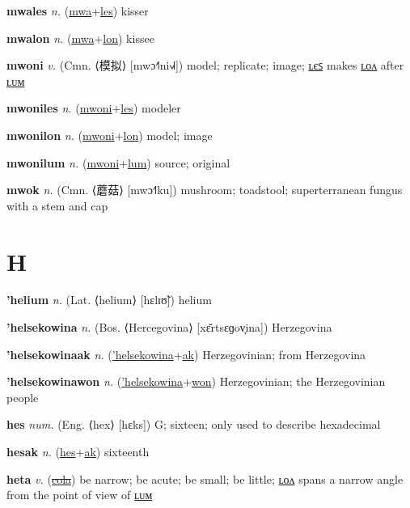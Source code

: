 \textbf{\hypertarget{mwales}{mwales}} \textit{n.} (\hyperlink{mwa}{mwa}+\allowbreak \hyperlink{les}{les})
kisser

\textbf{\hypertarget{mwalon}{mwalon}} \textit{n.} (\hyperlink{mwa}{mwa}+\allowbreak \hyperlink{lon}{lon})
kissee

\textbf{\hypertarget{mwoni}{mwoni}} \textit{v.} (Cmn. ⟨{\chinese{}模拟}⟩ [mwɔ˧˥ni˧˩˧])
model; replicate; image; \hyperlink{mwoniles}{ʟєꜱ} makes \hyperlink{mwonilon}{ʟᴏᴧ} after \hyperlink{mwonilum}{ʟᴜᴍ}

\textbf{\hypertarget{mwoniles}{mwoniles}} \textit{n.} (\hyperlink{mwoni}{mwoni}+\allowbreak \hyperlink{les}{les})
modeler

\textbf{\hypertarget{mwonilon}{mwonilon}} \textit{n.} (\hyperlink{mwoni}{mwoni}+\allowbreak \hyperlink{lon}{lon})
model; image

\textbf{\hypertarget{mwonilum}{mwonilum}} \textit{n.} (\hyperlink{mwoni}{mwoni}+\allowbreak \hyperlink{lum}{lum})
source; original

\textbf{\hypertarget{mwok}{mwok}} \textit{n.} (Cmn. ⟨{\chinese{}蘑菇}⟩ [mwɔ˧˥ku])
mushroom; toadstool; superterranean fungus with a stem and cap

\section{H}

\textbf{\hypertarget{'helium}{'helium}} \textit{n.} (Lat. ⟨helium⟩ [hɛlɪʊ̃])
helium

\textbf{\hypertarget{'helsekowina}{'helsekowina}} \textit{n.} (Bos. ⟨Hercegovina⟩ [xɛ̌rtsɛɡov̞ina])
Herzegovina

\textbf{\hypertarget{'helsekowinaak}{'helsekowinaak}} \textit{n.} (\hyperlink{'helsekowina}{'helsekowina}+\allowbreak \hyperlink{ak}{ak})
Herzegovinian; from Herzegovina

\textbf{\hypertarget{'helsekowinawon}{'helsekowinawon}} \textit{n.} (\hyperlink{'helsekowina}{'helsekowina}+\allowbreak \hyperlink{won}{won})
Herzegovinian; the Herzegovinian people

\textbf{\hypertarget{hes}{hes}} \textit{num.} (Eng. ⟨hex⟩ [hɛks])
G; sixteen; only used to describe hexadecimal

\textbf{\hypertarget{hesak}{hesak}} \textit{n.} (\hyperlink{hes}{hes}+\allowbreak \hyperlink{ak}{ak})
sixteenth

\textbf{\hypertarget{heta}{heta}} \textit{v.} (\hyperlink{cola}{\sout{cola}})
be narrow; be acute; be small; be little; \hyperlink{hetalon}{ʟᴏᴧ} spans a narrow angle from the point of view of \hyperlink{hetalum}{ʟᴜᴍ}

